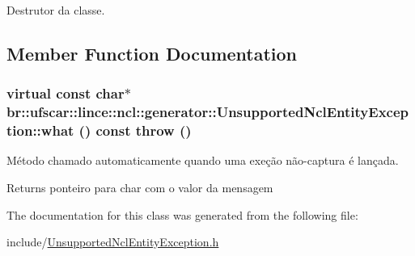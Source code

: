 Destrutor da classe. 



\subsection{Member Function Documentation}
\hypertarget{classbr_1_1ufscar_1_1lince_1_1ncl_1_1generator_1_1UnsupportedNclEntityException_a45845d073dff3d90a08938a9058edc7e}{
\subsubsection[{what}]{\setlength{\rightskip}{0pt plus 5cm}virtual const char$\ast$ br::ufscar::lince::ncl::generator::UnsupportedNclEntityException::what () const  throw ()}}
\label{classbr_1_1ufscar_1_1lince_1_1ncl_1_1generator_1_1UnsupportedNclEntityException_a45845d073dff3d90a08938a9058edc7e}


Método chamado automaticamente quando uma exeção não-\/captura é lançada. 

\begin{DoxyReturn}{Returns}
ponteiro para char com o valor da mensagem 
\end{DoxyReturn}


The documentation for this class was generated from the following file:\begin{DoxyCompactItemize}
\item 
include/\hyperlink{UnsupportedNclEntityException_8h}{UnsupportedNclEntityException.h}\end{DoxyCompactItemize}
